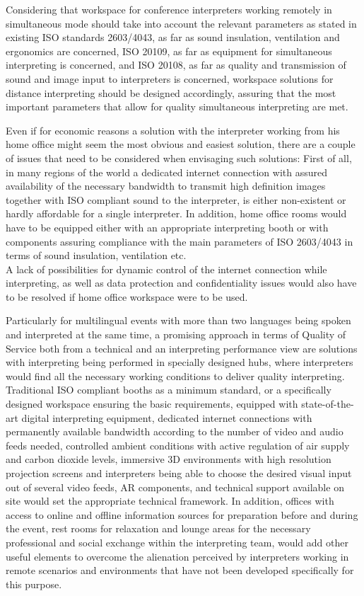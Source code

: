\documentclass[output=paper]{langsci/langscibook}
\begin{document}
Considering that workspace for conference interpreters working remotely in simultaneous mode should take into account the relevant parameters as stated in existing ISO standards 2603/4043, as far as sound insulation, ventilation and ergonomics are concerned, ISO 20109, as far as equipment for simultaneous interpreting is concerned, and ISO 20108, as far as quality and transmission of sound and image input to interpreters is concerned, workspace solutions for distance interpreting should be designed accordingly, assuring that the most important parameters that allow for quality simultaneous interpreting are met.

Even if for economic reasons a solution with the interpreter working from his home office might seem the most obvious and easiest solution, there are a couple of issues that need to be considered when envisaging such solutions: First of all, in many regions of the world a dedicated internet connection with assured availability of the necessary bandwidth to transmit high definition images together with ISO compliant sound to the interpreter, is either non-existent or hardly affordable for a single interpreter. In addition, home office rooms would have to be equipped either with an appropriate interpreting booth or with components assuring compliance with the main parameters of ISO 2603/4043 in terms of sound insulation, ventilation etc. \\
A lack of possibilities for dynamic control of the internet connection while interpreting, as well as data protection and confidentiality issues would also have to be resolved if home office workspace were to be used.

Particularly for multilingual events with more than two languages being spoken and interpreted at the same time, a promising approach in terms of Quality of Service both from a technical and an interpreting performance view are solutions with interpreting being performed in specially designed hubs, where interpreters would find all the necessary working conditions to deliver quality interpreting. Traditional ISO compliant booths as a minimum standard, or a specifically designed workspace ensuring the basic requirements, equipped with state-of-the-art digital interpreting equipment, dedicated internet connections with permanently available bandwidth according to the number of video and audio feeds needed, controlled ambient conditions with active regulation of air supply and carbon dioxide levels, immersive 3D environments with high resolution projection screens and interpreters being able to choose the desired visual input out of several video feeds, AR components, and technical support available on site would set the appropriate technical framework. In addition, offices with access to online and offline information sources for preparation before and during the event, rest rooms for relaxation and lounge areas for the necessary professional and social exchange within the interpreting team, would add other useful elements to overcome the alienation perceived by interpreters working in remote scenarios and environments that have not been developed specifically for this purpose. 
\end{document}
